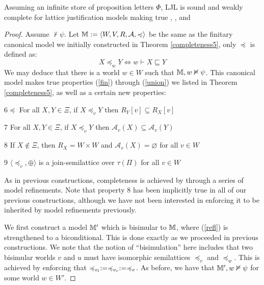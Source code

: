 \begin{theorem}
  \label{completeness6}Assuming an infinite store of proposition letters
  $\Phi$, LJL is sound and weakly complete for lattice justification models
  making true , ,  and
\end{theorem}

\begin{proof}
  Assume $\nvdash \psi$.  Let $\mathbbm{M} \assign \langle W, V, R,
  \mathcal{A}, \preccurlyeq \rangle$ be the same as the finitary canonical
  model we initially constructed in Theorem \ref{completeness5}, only
  $\preccurlyeq$ is defined as:
  \[ X \preccurlyeq_w Y \Longleftrightarrow w \vdash X \sqsubseteq Y \]
  We may deduce that there is a world $w \in W$ such that $\mathbbm{M}, w
  \nvDash \psi$.  This canonical model makes true properties (\ref{fin})
  through (\ref{union}) we listed in Theorem \ref{completeness5}, as well as a
  certain new properties:
  
  \begin{descriptioncompact}
    \item[6$\preccurlyeq$] For all $X, Y \in \Xi$, if $X \preccurlyeq_v Y$
    then $R_Y [v] \subseteq R_X [v]$
    
    \item[7] For all $X, Y \in \Xi$, if $X \preccurlyeq_v Y$ then
    $\mathcal{A}_v (X) \subseteq \mathcal{A}_v (Y)$
    
    \item[8] If $X \nin \Xi$, then $R_X = W \times W$ and $\mathcal{A}_v (X) =
    \varnothing$ for all $v \in W$
    
    \item[9] $\langle \preccurlyeq_v, \oplus \rangle$ is a join-semilattice
    over $\tau (\Pi)$ for all $v \in W$
  \end{descriptioncompact}
  
  As in previous constructions, completeness is achieved by through a series
  of model refinements.  Note that property 8 has been implicitly true in all
  of our previous constructions, although we have not been interested in
  enforcing it to be inherited by model refinements previously.
  
  
  
  We first construct a model $\mathbbm{M}'$ which is bisimular to
  $\mathbbm{M}$, where (\ref{refl}) is strengthened to a biconditional.  This
  is done exactly as we proceeded in previous constructions. We note that the
  notion of ``bisimulation'' here includes that two bisimular worlds $v$ and
  $u$ must have isomorphic semilattices $\preccurlyeq_v$ and
  $\preccurlyeq_w$.  This is achieved by enforcing that $\preccurlyeq_{v_l}
  \assign \preccurlyeq_{v_r} \assign \preccurlyeq_v$. As before, we have that
  $\mathbbm{M}', w \nvDash \psi$ for some world $w \in W'$.
  

\end{proof}
